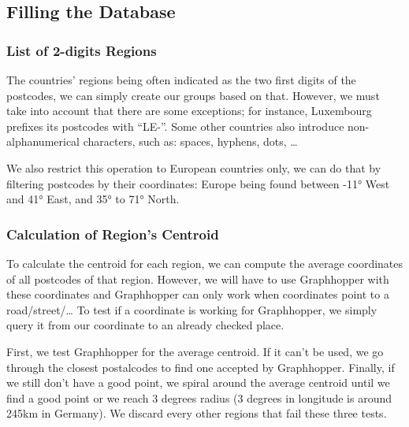 \subsection{Filling the Database}

\subsubsection{List of 2-digits Regions}

The countries' regions being often indicated as the two first digits of the
postcodes, we can simply create our groups based on that.
However, we must take into account that there are some exceptions; for instance,
Luxembourg prefixes its postcodes with ``LE-''.
Some other countries also introduce non-alphanumerical characters, such as:
spaces, hyphens, dots, \ldots{}

We also restrict this operation to European countries only, we can do that by filtering
postcodes by their coordinates: Europe being found between -11° West and 41° East,
and 35° to 71° North.

\subsubsection{Calculation of Region's Centroid}

To calculate the centroid for each region, we can compute the average coordinates
of all postcodes of that region. However, we will have to use Graphhopper with
these coordinates and Graphhopper can only work when coordinates point to a
road/street/\ldots{}
To test if a coordinate is working for Graphhopper, we simply query it from our
coordinate to an already checked place.

First, we test Graphhopper for the average centroid. If it can't be used, we go
through the closest postalcodes to find one accepted by Graphhopper. Finally, if
we still don't have a good point, we spiral around the average centroid until we
find a good point or we reach 3 degrees radius (3 degrees in longitude is around
245km in Germany). We discard every other regions that fail these three tests.
